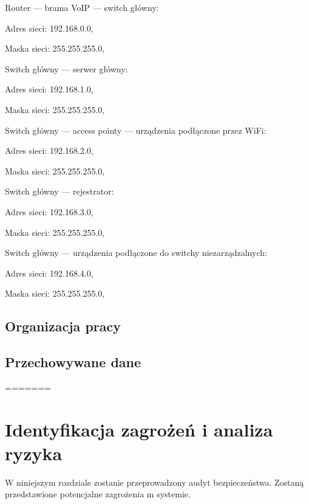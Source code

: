 \begin{minipage}[\right]{15cm}
\begin{itemize*}
	\item Router --- brama VoIP --- switch główny:
	\begin{itemize*}
		\item Adres sieci: 192.168.0.0,
		\item Maska sieci: 255.255.255.0,
	\end{itemize*}
	\item Switch główny --- serwer główny:
	\begin{itemize*}
		\item Adres sieci: 192.168.1.0,
		\item Maska sieci: 255.255.255.0,
	\end{itemize*}
	\item Switch główny --- access pointy --- urządzenia podłączone przez WiFi:
	\begin{itemize*}
		\item Adres sieci: 192.168.2.0,
		\item Maska sieci: 255.255.255.0,
	\end{itemize*}
	\item Switch główny --- rejestrator:
	\begin{itemize*}
		\item Adres sieci: 192.168.3.0,
		\item Maska sieci: 255.255.255.0,
	\end{itemize*}
	\item Switch główny --- urządzenia podłączone do switchy niezarządzalnych:
	\begin{itemize*}
		\item Adres sieci: 192.168.4.0,
		\item Maska sieci: 255.255.255.0,
	\end{itemize*}
\end{itemize*}
\end{minipage}

\newpage
\subsection{Organizacja pracy}

\newpage
\subsection{Przechowywane dane}
=======

\newpage\section{Identyfikacja zagrożeń i analiza \newline ryzyka}
W niniejszym rozdziale zostanie przeprowadzony audyt bezpieczeństwa. Zostaną przedstawione potencjalne zagrożenia m systemie.

